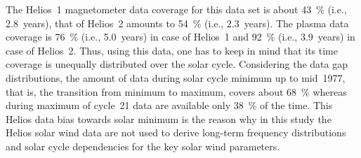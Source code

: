 The Helios~1 magnetometer data coverage for this data set is about \SI{43}{\%} (i.e., 2.8~years), that of Helios~2 amounts to \SI{54}{\%} (i.e., 2.3~years). The plasma data coverage is \SI{76}{\%} (i.e., 5.0~years) in case of Helios~1 and \SI{92}{\%} (i.e., 3.9~years) in case of Helios~2. 
Thus, using this data, one has to keep in mind that its time coverage is unequally distributed over the solar cycle. Considering the data gap distributions, the amount of data during solar cycle minimum up to mid~1977, that is, the transition from minimum to maximum, covers about \SI{68}{\percent} whereas during maximum of cycle~21 data are available only \SI{38}{\percent} of the time. This Helios data bias towards solar minimum is the reason why in this study the Helios solar wind data are not used to derive long-term frequency distributions and solar cycle dependencies for the key solar wind parameters.
% 

